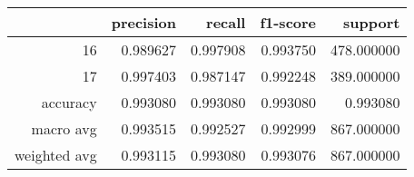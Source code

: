\begin{tabular}{rrrrr}
\toprule
 & precision & recall & f1-score & support \\
\midrule
16 & 0.989627 & 0.997908 & 0.993750 & 478.000000 \\
17 & 0.997403 & 0.987147 & 0.992248 & 389.000000 \\
accuracy & 0.993080 & 0.993080 & 0.993080 & 0.993080 \\
macro avg & 0.993515 & 0.992527 & 0.992999 & 867.000000 \\
weighted avg & 0.993115 & 0.993080 & 0.993076 & 867.000000 \\
\bottomrule
\end{tabular}
